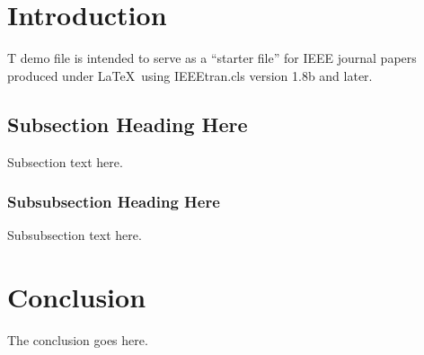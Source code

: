 \documentclass[journal,12pt,onecolumn,draftclsnofoot,]{sty/IEEEtran}
\begin{document}
\IEEEpeerreviewmaketitle
\newpage

\section{Introduction}
T demo file is intended to serve as a ``starter file''
for IEEE journal papers produced under \LaTeX\ using
IEEEtran.cls version 1.8b and later. \cite{IEEEexample:natbib}

\subsection{Subsection Heading Here}
Subsection text here.

\subsubsection{Subsubsection Heading Here}
Subsubsection text here.


\section{Conclusion}
The conclusion goes here.

\newpage



\end{document}
